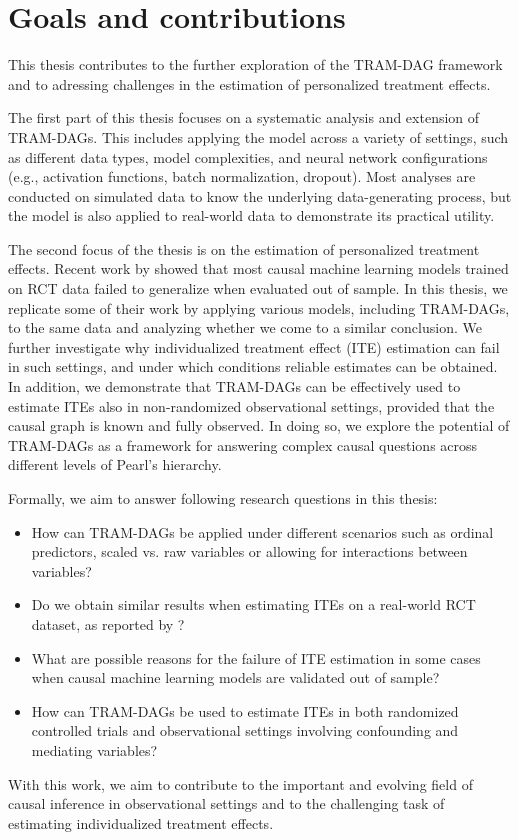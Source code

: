 \section{Goals and contributions} \label{sec:goals_contributions}

This thesis contributes to the further exploration of the TRAM-DAG framework and to adressing challenges in the estimation of personalized treatment effects.

The first part of this thesis focuses on a systematic analysis and extension of TRAM-DAGs. This includes applying the model across a variety of settings, such as different data types, model complexities, and neural network configurations (e.g., activation functions, batch normalization, dropout). Most analyses are conducted on simulated data to know the underlying data-generating process, but the model is also applied to real-world data to demonstrate its practical utility.

The second focus of the thesis is on the estimation of personalized treatment effects. Recent work by \citet{chen2025} showed that most causal machine learning models trained on RCT data failed to generalize when evaluated out of sample. In this thesis, we replicate some of their work by applying various models, including TRAM-DAGs, to the same data and analyzing whether we come to a similar conclusion. We further investigate why individualized treatment effect (ITE) estimation can fail in such settings, and under which conditions reliable estimates can be obtained. In addition, we demonstrate that TRAM-DAGs can be effectively used to estimate ITEs also in non-randomized observational settings, provided that the causal graph is known and fully observed. In doing so, we explore the potential of TRAM-DAGs as a framework for answering complex causal questions across different levels of Pearl's hierarchy.



Formally, we aim to answer following research questions in this thesis:

\begin{itemize}
    \item How can TRAM-DAGs be applied under different scenarios such as ordinal predictors, scaled vs. raw variables or allowing for interactions between variables?
    \item Do we obtain similar results when estimating ITEs on a real-world RCT dataset, as reported by \citet{chen2025}?
    \item What are possible reasons for the failure of ITE estimation in some cases when causal machine learning models are validated out of sample?
    \item How can TRAM-DAGs be used to estimate ITEs in both randomized controlled trials and observational settings involving confounding and mediating variables?
\end{itemize}



With this work, we aim to contribute to the important and evolving field of causal inference in observational settings and to the challenging task of estimating individualized treatment effects.
